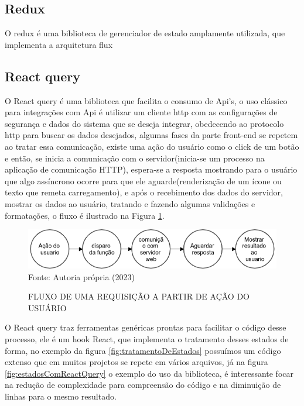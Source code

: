 \documentclass{ufersa}
\begin{document}
\subsection{Redux}
    O redux é uma biblioteca de gerenciador de estado amplamente utilizada, que implementa a arquitetura flux 

\subsection{React query}

O React query é uma biblioteca que facilita o consumo de Api's, o uso clássico para integrações com Api é utilizar um cliente http com as configurações de segurança e dados do sistema que se deseja integrar, obedecendo ao protocolo http para buscar os dados desejados, algumas fases da parte front-end se repetem ao tratar essa comunicação, existe uma ação do usuário como o click de um botão e então, se inicia a comunicação com o servidor(inicia-se um processo na aplicação de comunicação HTTP), espera-se a resposta mostrando para o usuário que algo assíncrono ocorre para que ele aguarde(renderização de um ícone ou texto que remeta carregamento), e após o recebimento dos dados do servidor, mostrar os dados ao usuário, tratando e fazendo algumas validações e formatações, o fluxo é ilustrado na Figura \ref{fig:fluxoRequisicao}. 

\begin{figure}[!h]
\centering 
\caption{FLUXO DE UMA REQUISIÇÃO A PARTIR DE AÇÃO DO USUÁRIO }
\includegraphics[width=16cm]{assets/Fluxo de requisição.png} 
{\footnotesize Fonte: Autoria própria (2023)}
\label{fig:fluxoRequisicao}
\end{figure}


O React query traz ferramentas genéricas prontas para facilitar o código desse processo, ele é um hook React, que implementa o tratamento desses estados de forma, no exemplo da figura \ref{fig:tratamentoDeEstados} possuímos um código extenso que em muitos projetos se repete em vários arquivos, já na figura \ref{fig:estadosComReactQuery} o exemplo do uso da biblioteca, é interessante focar na redução de complexidade para compreensão do código e na diminuição de linhas para o mesmo resultado.
\end{document}
